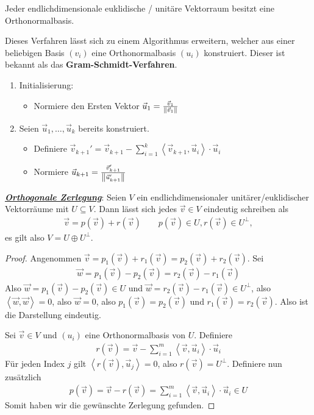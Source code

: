\documentclass{report}
\newcommand*{\newpar}{\par\vspace{\baselineskip}\noindent}
\newcommand{\tbf}[1]{\textbf{#1}}
\newcommand{\ul}[1]{\underline{#1}}
\renewcommand{\vu}{\vec{u}}
\newcommand{\vv}{\vec{v}}
\newcommand{\vw}{\vec{w}}
\newcommand{\scalar}[2]{\left\langle #1, #2 \right\rangle}
\begin{document}
\begin{corollary}
 Jeder endlichdimensionale euklidische / unitäre Vektorraum besitzt eine Orthonormalbasis.
\end{corollary}
\begin{definition}
 Dieses Verfahren lässt sich zu einem Algorithmus erweitern, welcher aus einer beliebigen Basis $(v_i)$ eine Orthonormalbasis $(u_i)$ konstruiert. Dieser ist bekannt als das \tbf{Gram-Schmidt-Verfahren}.
 \begin{enumerate}
  \item Initialisierung:
  \begin{itemize}
   \item Normiere den Ersten Vektor $\vu_1 = \frac{\vv_1}{\norm{\vv_1}}$
  \end{itemize}
  \item Seien $\vu_1, \hdots, \vu_k$ bereits konstruiert.
  \begin{itemize}
   \item Definiere $\vv_{k+1}' = \vv_{k+1} - \sum_{i = 1}^k \scalar{\vv_{k+1}}{\vu_i} \cdot \vu_i$
   \item Normiere $\vu_{k+1} = \frac{\vv_{k+1}'}{\norm{\vu_{k+1}'}}$
  \end{itemize}
 \end{enumerate}
\end{definition}
\begin{theorem}\emph{\ul{\tbf{Orthogonale Zerlegung}}}:
 Seien $V$ ein endlichdimensionaler unitärer/euklidischer Vektorräume mit $U \subseteq V$. Dann lässt sich jedes $\vv \in V$ eindeutig schreiben als 
 \begin{align*}
  \vv = p(\vv) + r(\vv) \qquad p(\vv) \in U, r(\vv) \in U^{\bot},
 \end{align*}
 es gilt also $V = U \oplus U^\bot$.
\end{theorem}
\begin{proof}
 Angenommen $\vv = p_1(\vv) + r_1(\vv) = p_2(\vv) + r_2(\vv)$. Sei 
 \begin{align*}
  \vw = p_1(\vv) - p_2(\vv) = r_2(\vv) - r_1(\vv)
 \end{align*}
 Also $\vw = p_1(\vv) - p_2(\vv) \in U$ und $\vw = r_2(\vv) - r_1(\vv) \in U^\bot$, also $\scalar{\vw}{\vw} = 0$, also $\vw = 0$, also $p_1(\vv) = p_2(\vv)$ und $r_1(\vv) = r_2(\vv)$. Also ist die Darstellung eindeutig.
 \newpar
 Sei $\vv \in V$ und $(u_i)$ eine Orthonormalbasis von $U$. Definiere 
 \begin{align*}
  r(\vv) = \vv - \sum_{i=1}^m \scalar{\vv}{\vu_i} \cdot \vu_i
 \end{align*}
 Für jeden Index $j$ gilt $\scalar{r(\vv)}{\vu_j} = 0$, also $r(\vv) = U^\bot$. Definiere nun zusätzlich
 \begin{align*}
  p(\vv) = \vv - r(\vv) = \sum_{i = 1}^m \scalar{\vv}{\vu_i} \cdot \vu_i \in U
 \end{align*}
 Somit haben wir die gewünschte Zerlegung gefunden.
\end{proof}
\end{document}

